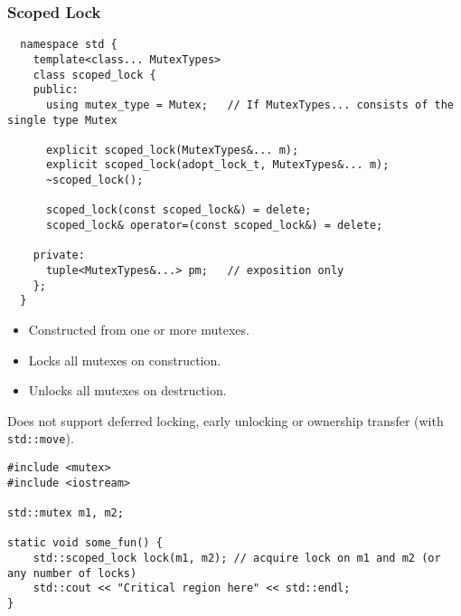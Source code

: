 \subsubsection{Scoped Lock}
\begin{verbatim}
  namespace std {
    template<class... MutexTypes>
    class scoped_lock {
    public:
      using mutex_type = Mutex;   // If MutexTypes... consists of the single type Mutex
    
      explicit scoped_lock(MutexTypes&... m);
      explicit scoped_lock(adopt_lock_t, MutexTypes&... m);
      ~scoped_lock();
    
      scoped_lock(const scoped_lock&) = delete;
      scoped_lock& operator=(const scoped_lock&) = delete;
    
    private:
      tuple<MutexTypes&...> pm;   // exposition only
    };
  }
\end{verbatim}
\begin{itemize}
  \item Constructed from one or more mutexes.
  \item Locks all mutexes on construction.
  \item Unlocks all mutexes on destruction.
\end{itemize}
\begin{consbox}
  Does not support deferred locking, early unlocking or ownership transfer (with \texttt{std::move}).
\end{consbox}

\begin{verbatim}
#include <mutex>
#include <iostream>

std::mutex m1, m2;

static void some_fun() {
    std::scoped_lock lock(m1, m2); // acquire lock on m1 and m2 (or any number of locks)
    std::cout << "Critical region here" << std::endl;
}
\end{verbatim}

